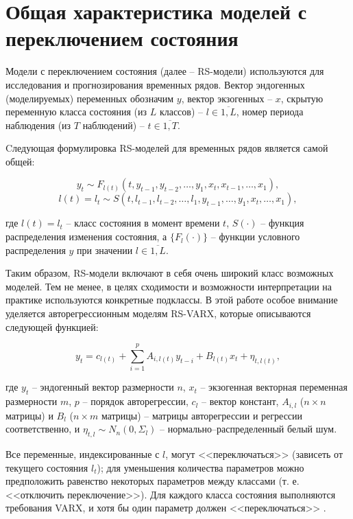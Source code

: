 \documentclass[a4paper,14pt]{extreport}
\begin{document}
\label{chapter:rs_models}

\section{Общая характеристика моделей с переключением состояния}
Модели с переключением состояния (далее – RS-модели) используются для исследования и прогнозирования временных рядов. Вектор эндогенных (моделируемых) переменных обозначим $y$, вектор экзогенных -- $x$, скрытую переменную класса состояния (из $L$ классов) -- $l \in \overline{1, L}$, номер периода наблюдения (из $T$ наблюдений) -- $t \in \overline{1,T}$.

Cледующая формулировка RS-моделей для временных рядов является самой общей:

\begin{equation}
	y_t \sim F_{l(t)}(t, y_{t-1}, y_{t-2}, \dots, y_1, x_t, x_{t-1}, \dots, x_1) ,
\end{equation}
\begin{equation}
	l(t) = l_t \sim S(t, l_{t-1}, l_{t-2}, \dots, l_1, y_{t-1}, \dots, y_1, x_t, \dots, x_1) ,
\end{equation}

\noindent
где $l(t) = l_t$ -- класс состояния в момент времени $t$, $S(\cdot)$ -- функция распределения изменения состояния, а $\{F_l(\cdot)\}$ -- функции условного распределения $y$ при значении $l \in \overline{1,L}$. 

Таким образом, RS-модели включают в себя очень широкий класс возможных моделей. Тем не менее, в целях сходимости и возможности интерпретации на практике используются конкретные подклассы. В этой работе особое внимание уделяется авторегрессионным моделям RS-VARX, которые описываются следующей функцией:

\begin{equation}
	y_{t}=c_{l(t)} + \sum_{i=1}^{p} A_{i,l(t)} y_{t-i} + B_{l(t)} x_{t} + \eta_{t, l(t)} ,
\end{equation}

\noindent
где 
$y_t$ -- эндогенный вектор размерности $n$, 
$x_{t}$ -- экзогенная векторная переменная размерности $m$,
$p$ -- порядок авторегрессии, 
$c_{l}$ -- вектор констант,
$A_{i,l}$ ($n \times n$ матрицы) и $B_{l}$ ($n \times m$ матрицы) -- матрицы авторегрессии и регрессии соответственно,
и $\eta_{t, l} \sim N_n(0, \Sigma_{l}) $ -- нормально–распределенный белый шум.

Все переменные, индексированные с $l$, могут <<переключаться>> (зависеть от текущего состояния $l_t$); для уменьшения количества параметров можно предположить равенство некоторых параметров между классами (т. е. <<отключить переключение>>). Для каждого класса состояния выполняются требования VARX, и хотя бы один параметр должен <<переключаться>> \cite{malNovopMSVARX}.
\end{document}
